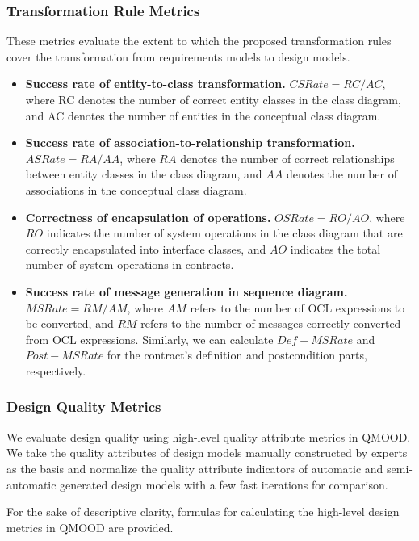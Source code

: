 \documentclass[pdflatex,sn-mathphys-num]{sn-jnl}%
\theoremstyle{thmstyleone}%
\theoremstyle{thmstyletwo}%
\theoremstyle{thmstylethree}%
\begin{document}
\subsubsection{Transformation Rule Metrics}
These metrics evaluate the extent to which the proposed transformation rules cover the transformation from requirements models to design models.
\begin{itemize}
    \item \textbf{Success rate of entity-to-class transformation.} $CSRate = {RC}/{AC}$, where RC denotes the number of correct entity classes in the class diagram, and AC denotes the number of entities in the conceptual class diagram.
    \item \textbf{Success rate of association-to-relationship transformation.} $ASRate = {RA}/{AA}$, where $RA$ denotes the number of correct relationships between entity classes in the class diagram, and $AA$ denotes the number of associations in the conceptual class diagram.
    \item \textbf{Correctness of encapsulation of operations.} $OSRate = {RO}/{AO}$, where $RO$ indicates the number of system operations in the class diagram that are correctly encapsulated into interface classes, and $AO$ indicates the total number of system operations in contracts.
    \item \textbf{Success rate of message generation in sequence diagram.} $MSRate = {RM}/{AM}$, where $AM$ refers to the number of OCL expressions to be converted, and $RM$ refers to the number of messages correctly converted from OCL expressions. Similarly, we can calculate $Def-MSRate$ and $Post-MSRate$ for the contract's definition and postcondition parts, respectively. 
\end{itemize}
\subsubsection{Design Quality Metrics}
We evaluate design quality using high-level quality attribute metrics in QMOOD. We take the quality attributes of design models manually constructed by experts as the basis and normalize the quality attribute indicators of automatic and semi-automatic generated design models with a few fast iterations for comparison.

For the sake of descriptive clarity, formulas for calculating the high-level design metrics in QMOOD are provided.
\end{document}
